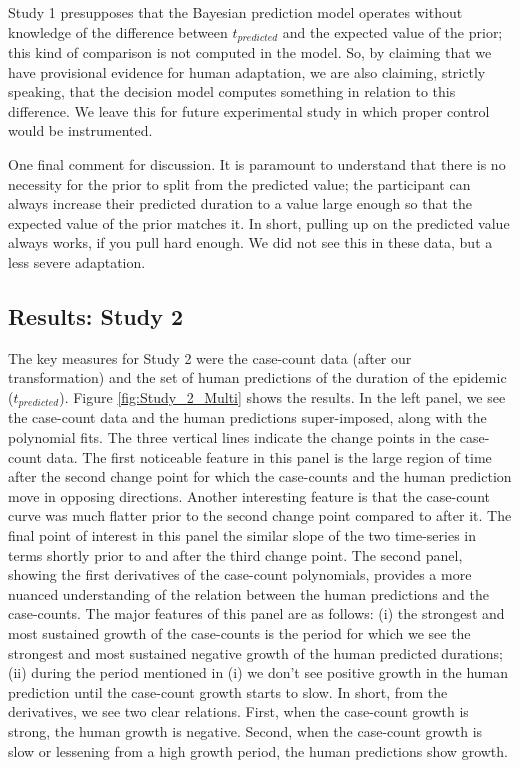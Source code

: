 \documentclass[a4paper,man,natbib]{apa6}
\begin{document}
Study 1 presupposes that the Bayesian prediction model operates without knowledge of the difference between $t_{predicted}$ and the expected value of the prior; this kind of comparison is not computed in the model.  So, by claiming that we have provisional evidence for human adaptation, we are also claiming, strictly speaking, that the decision model computes something in relation to this difference.  We leave this for future experimental study in which proper control would be instrumented.

One final comment for discussion.  It is paramount to understand that there is no necessity for the prior to split from the predicted value; the participant can always increase their predicted duration to a value large enough so that the expected value of the prior matches it.  In short, pulling up on the predicted value always works, if you pull hard enough.  We did not see this in these data, but a less severe adaptation.

\subsection{Results: Study 2}
The key measures for Study 2 were the case-count data (after our transformation) and the set of human predictions of the duration of the epidemic ($t_{predicted}$).  Figure \ref{fig:Study_2_Multi} shows the results.  In the left panel, we see the case-count data and the human predictions super-imposed, along with the polynomial fits.  The three vertical lines indicate the change points in the case-count data.  The first noticeable feature in this panel is the large region of time after the second change point for which the case-counts and the human prediction move in opposing directions.  Another interesting feature is that the case-count curve was much flatter prior to the second change point compared to after it.  The final point of interest in this panel the similar slope of the two time-series in terms shortly prior to and after the third change point.  The second panel, showing the first derivatives of the case-count polynomials, provides a more nuanced understanding of the relation between the human predictions and the case-counts.  The major features of this panel are as follows:  (i) the strongest and most sustained growth of the case-counts is the period for which we see the strongest and most sustained negative growth of the human predicted durations; (ii) during the period mentioned in (i) we don't see positive growth in the human prediction until the case-count growth starts to slow.  In short, from the derivatives, we see two clear relations.  First, when the case-count growth is strong, the human growth is negative.  Second, when the case-count growth is slow or lessening from a high growth period, the human predictions show growth. 
 
\end{document}

